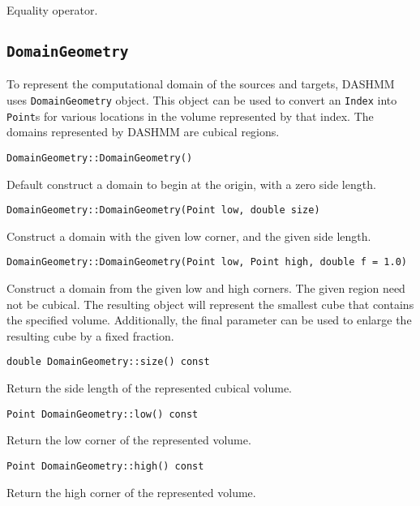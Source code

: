 Equality operator.


\subsection{\texttt{DomainGeometry}}

To represent the computational domain of the sources and targets, DASHMM
uses \texttt{DomainGeometry} object. This object can be used to convert
an \texttt{Index} into \texttt{Point}s for various locations in the volume
represented by that index. The domains represented by DASHMM are cubical
regions.

\begin{lstlisting}
DomainGeometry::DomainGeometry()
\end{lstlisting}


Default construct a domain to begin at the origin, with a zero side length.

\begin{lstlisting}
DomainGeometry::DomainGeometry(Point low, double size)
\end{lstlisting}


Construct a domain with the given low corner, and the given side length.

\begin{lstlisting}
DomainGeometry::DomainGeometry(Point low, Point high, double f = 1.0)
\end{lstlisting}


Construct a domain from the given low and high corners. The given region need
not be cubical. The resulting object will represent the smallest cube that
contains the specified volume. Additionally, the final parameter can be used
to enlarge the resulting cube by a fixed fraction.

\begin{lstlisting}
double DomainGeometry::size() const
\end{lstlisting}


Return the side length of the represented cubical volume.

\begin{lstlisting}
Point DomainGeometry::low() const
\end{lstlisting}


Return the low corner of the represented volume.

\begin{lstlisting}
Point DomainGeometry::high() const
\end{lstlisting}

Return the high corner of the represented volume.

